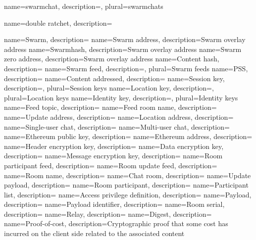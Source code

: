 {
	name={swarmchat},
	description={},
	plural={swarmchats}
}

{
	name={double ratchet},
	description={}
}

{
	name={Swarm},
	description={}
}
{
	name={Swarm address},
	description={Swarm overlay address}
}
{
	name={Swarmhash},
	description={Swarm overlay address}
}
{
	name={Swarm zero address},
	description={Swarm overlay address}
}
{
	name={Content hash},
	description={}
}
{
	name={Swarm feed},
	description={},
	plural={Swarm feeds}
}
{
	name={PSS},
	description={}
}
{
	name={Content addressed},
	description={}
}
{
	name={Session key},
	description={},
	plural={Session keys}
}
{
	name={Location key},
	description={},
	plural={Location keys}
}
{
	name={Identity key},
	description={},
	plural={Identity keys}
}
{
	name={Feed topic},
	description={}
}
{
	name={Feed room name},
	description={}
}
{
	name={Update address},
	description={}
}
{
	name={Location address},
	description={}
}
{
	name={Single-user chat},
	description={}
}
{
	name={Multi-user chat},
	description={}
}
{
	name={Ethereum public key},
	description={}
}
{
	name={Ethereum address},
	description={}
}
{
	name={Header encryption key},
	description={}
}
{
	name={Data encryption key},
	description={}
}
{
	name={Message encryption key},
	description={}
}
{
	name={Room participant feed},
	description={}
}
{
	name={Room update feed},
	description={}
}
{
	name={Room name},
	description={}
}
{
	name={Chat room},
	description={}
}
{
	name={Update payload},
	description={}
}
{
	name={Room participant},
	description={}
}
{
	name={Participant list},
	description={}
}
{
	name={Access privilege definition},
	description={}
}
{
	name={Payload},
	description={}
}
{
	name={Payload identifier},
	description={}
}
{
	name={Room serial},
	description={}
}
{
	name={Relay},
	description={}
}
{
	name={Digest},
	description={}
}
{
	name={Proof-of-cost},
	description={Cryptographic proof that some cost has incurred on the client side related to the associated content}
}
